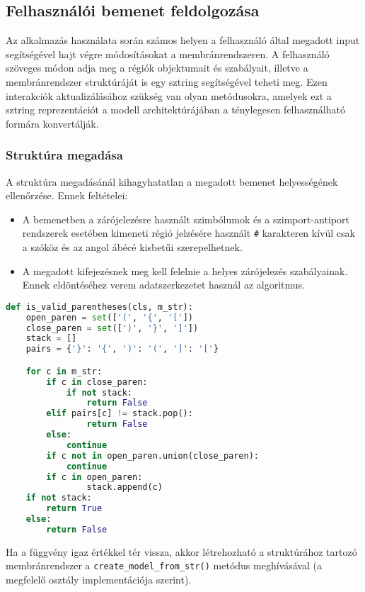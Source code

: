 \subsection{Felhasználói bemenet feldolgozása}

Az alkalmazás használata során számos helyen a felhasználó által megadott input segítségével hajt végre módosításokat a membránrendszeren. A felhasználó szöveges módon adja meg a régiók objektumait és szabályait, illetve a membránrendszer struktúráját is egy sztring segítségével teheti meg. Ezen interakciók aktualizálásához szükség van olyan metódusokra, amelyek ezt a sztring reprezentációt a modell architektúrájában a ténylegesen felhasználható formára konvertálják.

\subsubsection{Struktúra megadása}
A struktúra megadásánál kihagyhatatlan a megadott bemenet helyességének ellenőrzése.
Ennek feltételei:
\begin{itemize}
\item A bemenetben a zárójelezésre használt szimbólumok és a szimport-antiport rendszerek esetében kimeneti régió jelzésére használt \verb|#| karakteren kívül csak a szóköz és az angol ábécé kisbetűi szerepelhetnek.
\item A megadott kifejezésnek meg kell felelnie a helyes zárójelezés szabályainak. Ennek eldöntéséhez verem adatszerkezetet használ az algoritmus.
\end{itemize}

\begin{lstlisting}[language={Python}]
def is_valid_parentheses(cls, m_str):
	open_paren = set(['(', '{', '['])
	close_paren = set([')', '}', ']'])
	stack = []
	pairs = {'}': '{', ')': '(', ']': '['}

	for c in m_str:
		if c in close_paren:
			if not stack:
				return False
		elif pairs[c] != stack.pop():
				return False
		else:
			continue
		if c not in open_paren.union(close_paren):
			continue
		if c in open_paren:
                stack.append(c)
	if not stack:
		return True
	else:
		return False
\end{lstlisting}

Ha a függvény igaz értékkel tér vissza, akkor létrehozható a struktúrához tartozó membránrendszer a \verb|create_model_from_str()| metódus meghívásával (a megfelelő osztály implementációja szerint). 

